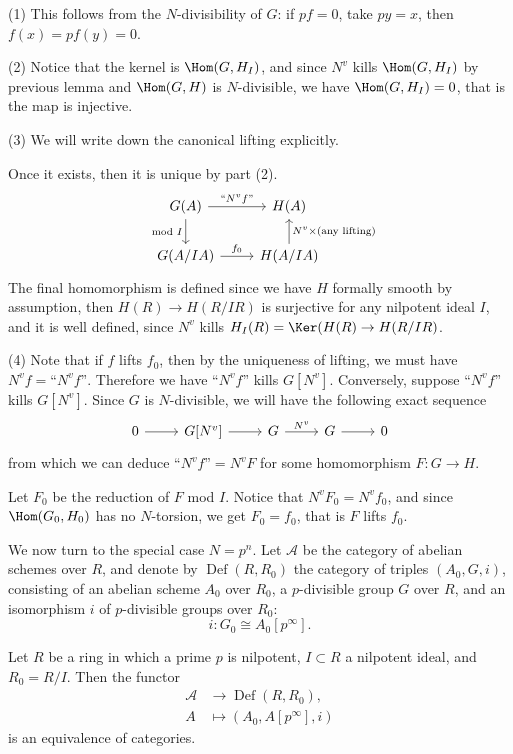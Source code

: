 \documentclass[twoside]{article}
\begin{document}
\pf
    (1)
    This follows from the $N$-divisibility of $G$:
    if $pf=0$, take $py=x$, then $f(x)=pf(y)=0$.

    (2)
    Notice that the kernel is $\Hom(G,H_{I})$,
    and since $N^{v}$ kills $\Hom(G,H_{I})$ by previous lemma 
    and $\Hom(G,H)$ is $N$-divisible,
    we have $\Hom(G,H_{I})=0$, that is the map is injective.

    (3)
    We will write down the canonical lifting explicitly.

    Once it exists, then it is unique by part (2).
    \[ \begin{tikzcd}
        G(A)\ar[r, "\text{``}N^{v}f\text{''}"] \ar[d, "\mod I"'] & H(A) \\ 
        G(A/IA) \ar[r, "f_{0}"]& H(A/IA) \ar[u, "N^{v} \times (\text{any lifting})"']
    \end{tikzcd} \]
    The final homomorphism is defined since we have $H$ formally smooth by assumption,
    then $H(R)\to H(R/IR)$ is surjective for any nilpotent ideal $I$, and it is well defined,
    since $N^{v}$ kills $H_{I}(R)=\Ker(H(R) \to H(R/IR) $.
    
    (4) 
    Note that if $f$ lifts $f_{0}$,
    then by the uniqueness of lifting,
    we must have $N^{v}f=\text{``}N^{v}f\text{''}$.
    Therefore we have $\text{``}N^{v}f\text{''}$ kills $G[N^{v}]$.
    Conversely, suppose $\text{``}N^{v}f\text{''}$ kills $G[N^{v}]$.
    Since $G$ is $N$-divisible, we will have the following exact sequence 
    \[ \begin{tikzcd}
        0\ar[r] &G[N^{v}] \ar[r]&G \ar[r, "N^{v}"]& G\ar[r] & 0
    \end{tikzcd} \]
    from which we can deduce $\text{``}N^{v}f\text{''}=N^{v}F$ for some homomorphism $F\colon G \to H$.

    Let $F_{0}$ be the reduction of $F$ mod $I$.
    Notice that $N^{v}F_{0}=N^{v}f_{0}$,
    and since $\Hom(G_{0},H_{0})$ has no $N$-torsion,
    we get $F_{0} =f_{0}$, that is $F$ lifts $f_{0}$.
\epf

We now turn to the special case $N=p^{n}$.
Let $\mathscr{A}$  be the category of abelian schemes over $R$,
and denote by $\operatorname{Def}(R,R_{0})$ the category of triples $(A_{0},G,i)$,
consisting of an abelian scheme $A_{0}$ over $R_{0}$,
a $p$-divisible group $G$ over $R$,
and an isomorphism $i$ of $p$-divisible groups over $R_{0}$:
\[    i\colon     G_{0} \cong A_{0}[p^{\infty}] .  \]

\begin{theorem}
    Let $R$ be a ring in which a prime $p$ is nilpotent,
    $I \subset R$ a nilpotent ideal, and $R_{0}=R/I$.
    Then the functor
    \[ \begin{aligned}
        \mathscr{A} &\to \operatorname{Def}(R,R_{0}), \\
        A &\mapsto (A_{0},A[p^{\infty}],i)
    \end{aligned} \]
    is an equivalence of categories.
\end{theorem}
\end{document}
